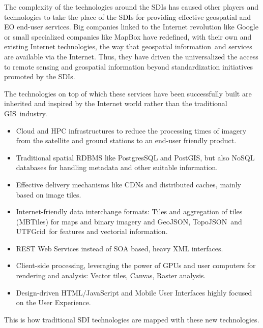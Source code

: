 \documentclass[a4paper]{article}
\newcommand\liststyleLFOxx{%
\renewcommand\labelitemi{[F0B7?]}
\renewcommand\labelitemii{o}
\renewcommand\labelitemiii{[F0A7?]}
\renewcommand\labelitemiv{[F0B7?]}
}
\begin{document}
The complexity of the technologies around the SDIs has caused other
players and technologies to take the place of the SDIs for providing
effective geospatial and EO end-user services. Big companies linked to
the Internet revolution like Google or small specialized companies like
MapBox have redefined, with their own and existing Internet
technologies, the way that geospatial information\ and services are
available via the Internet. Thus, they have driven the universalized
the access to remote sensing and geospatial information beyond
standardization initiatives promoted by the SDIs.

The technologies on top of which these services have been successfully
built are inherited and inspired by the Internet world rather than the
traditional GIS\ industry.\ 

\liststyleLFOxx
\begin{itemize}
\item Cloud and HPC infrastructures to reduce the processing times of
imagery from the satellite and ground stations to an end-user friendly
product.
\item Traditional spatial RDBMS like PostgresSQL and PostGIS, but also
NoSQL databases for handling metadata and other suitable information.
\item Effective delivery mechanisms like CDNs and distributed caches,
mainly based on image tiles.\ 
\item Internet-friendly data interchange formats: Tiles and aggregation
of tiles (MBTiles) for maps and binary imagery and GeoJSON,
TopoJSON\ and UTFGrid\ for features and vectorial information.
\item REST Web Services instead of SOA based, heavy XML interfaces.\ 
\item Client-side processing, leveraging the power of GPUs and user
computers for rendering and analysis: Vector tiles, Canvas, Raster
analysis.
\item Design-driven HTML/JavaScript and Mobile User Interfaces highly
focused on the User Experience.
\end{itemize}
This is how traditional SDI technologies are mapped with these new
technologies.


\bigskip
\end{document}
